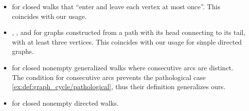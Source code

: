 \begin{remark}
\begin{thmenum}
\begin{itemize}
      \item {} for closed walks that \enquote{enter and leave each vertex at most once}. This coincides with our usage.

      \item {}, ,  and  for graphs constructed from a path with its head connecting to its tail, with at least three vertices. This coincides with our usage for simple directed graphs.

      \item {} for closed nonempty generalized walks where consecutive arcs are distinct. The condition for consecutive arcs prevents the pathological case \cref{ex:def:graph_cycle/pathological}, thus their definition generalizes ours.

      \item {} for closed nonempty directed walks.
    \end{itemize}
  \end{thmenum}
\end{remark}

